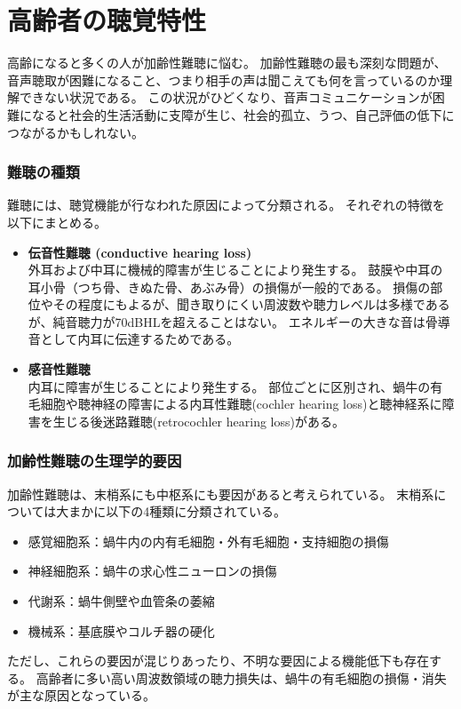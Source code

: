 

\clearpage
\section{高齢者の聴覚特性}
高齢になると多くの人が加齢性難聴に悩む。
加齢性難聴の最も深刻な問題が、音声聴取が困難になること、つまり相手の声は聞こえても何を言っているのか理解できない状況である。
この状況がひどくなり、音声コミュニケーションが困難になると社会的生活活動に支障が生じ、社会的孤立、うつ、自己評価の低下につながるかもしれない。

\subsubsection{難聴の種類}
難聴には、聴覚機能が行なわれた原因によって分類される。
それぞれの特徴を以下にまとめる。

\begin{itemize}
\item \textbf{伝音性難聴 (conductive hearing loss)}\\
 外耳および中耳に機械的障害が生じることにより発生する。
 鼓膜や中耳の耳小骨（つち骨、きぬた骨、あぶみ骨）の損傷が一般的である。
 損傷の部位やその程度にもよるが、聞き取りにくい周波数や聴力レベルは多様であるが、純音聴力が70dBHLを超えることはない。
 エネルギーの大きな音は骨導音として内耳に伝達するためである。
\item \textbf{感音性難聴}\\
 内耳に障害が生じることにより発生する。
 部位ごとに区別され、蝸牛の有毛細胞や聴神経の障害による内耳性難聴(cochler hearing loss)と聴神経系に障害を生じる後迷路難聴(retrocochler hearing loss)がある。
\end{itemize}


\subsubsection{加齢性難聴の生理学的要因}
加齢性難聴は、末梢系にも中枢系にも要因があると考えられている。
末梢系については大まかに以下の4種類に分類されている\cite{Schuknecht1993presbycusis}。
\begin{itemize}
\item 感覚細胞系：蝸牛内の内有毛細胞・外有毛細胞・支持細胞の損傷
\item 神経細胞系：蝸牛の求心性ニューロンの損傷
\item 代謝系：蝸牛側壁や血管条の萎縮
\item 機械系：基底膜やコルチ器の硬化
\end{itemize}
ただし、これらの要因が混じりあったり、不明な要因による機能低下も存在する。
高齢者に多い高い周波数領域の聴力損失は、蝸牛の有毛細胞の損傷・消失が主な原因となっている。



